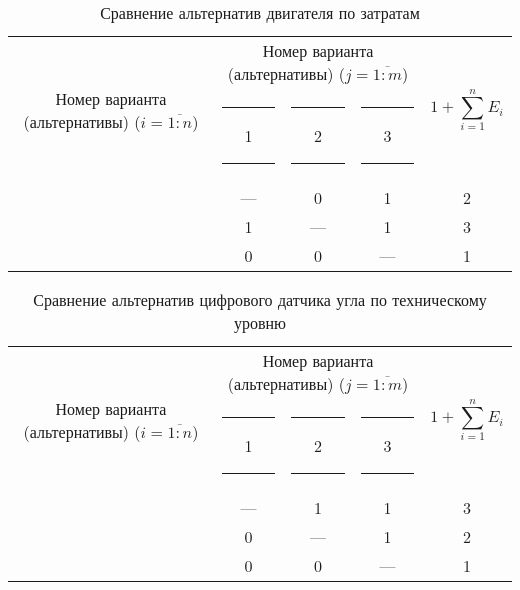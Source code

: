 \begin{table}[H]
    \centering
    \begin{tabular}{|c|c|c|c|c|}
        \hline
        \multirow{2}{2.4cm}[-0.5pc]{
            \centering
            Номер варианта (альтернативы) ($i = \overline{1:n}$)
        } &
        \multicolumn{3}{c|}{
            \parbox[t]{2.4cm}{
                \centering
                Номер варианта (альтернативы) ($j = \overline{1:m}$)
            }
        } &
        \multirow{2}{1.7cm}{
            \centering
            $$1 + \sum_{i=1}^n E_i$$
        } \\
        &
        \centering \rule{2pt}{0pt} 1 \rule{2pt}{0pt} &
        \centering \rule{2pt}{0pt} 2 \rule{2pt}{0pt} &
        \centering \rule{2pt}{0pt} 3 \rule{2pt}{0pt} & \\
        \hline \hline
        \centering{1} &---& 0 & 1 & 2 \\ \hline
        \centering{2} & 1 &---& 1 & 3 \\ \hline
        \centering{3} & 0 & 0 &---& 1 \\ \hline
    \end{tabular}
    \caption{Сравнение альтернатив двигателя по затратам}
    \label{tbl_motor_cost_lvl_comparison}
\end{table}

\begin{table}[H]
    \centering
    \begin{tabular}{|c|c|c|c|c|}
        \hline
        \multirow{2}{2.4cm}[-0.5pc]{
            \centering
            Номер варианта (альтернативы) ($i = \overline{1:n}$)
        } &
        \multicolumn{3}{c|}{
            \parbox[t]{2.4cm}{
                \centering
                Номер варианта (альтернативы) ($j = \overline{1:m}$)
            }
        } &
        \multirow{2}{1.7cm}{
            \centering
            $$1 + \sum_{i=1}^n E_i$$
        } \\
        &
        \centering \rule{2pt}{0pt} 1 \rule{2pt}{0pt} &
        \centering \rule{2pt}{0pt} 2 \rule{2pt}{0pt} &
        \centering \rule{2pt}{0pt} 3 \rule{2pt}{0pt} & \\
        \hline \hline
        \centering{1} &---& 1 & 1 & 3 \\ \hline
        \centering{2} & 0 &---& 1 & 2 \\ \hline
        \centering{3} & 0 & 0 &---& 1 \\ \hline
    \end{tabular}
    \caption{Сравнение альтернатив цифрового датчика угла по техническому уровню}
    \label{tbl_sensor_tech_lvl_comparison}
\end{table}

